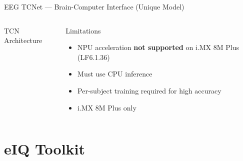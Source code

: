 \documentclass[aspectratio=169]{beamer}
\begin{document}
\begin{frame}{EEG TCNet — Brain-Computer Interface (Unique Model)}
\begin{columns}[T]
\begin{block}{TCN Architecture}
      \end{block}
      \vspace{4pt}
      \begin{block}{Limitations}
        \begin{itemize}\scriptsize
          \item NPU acceleration \textbf{not supported} on i.MX 8M Plus (LF6.1.36)
          \item Must use CPU inference
          \item Per-subject training required for high accuracy
          \item i.MX 8M Plus only
        \end{itemize}
      \end{block}
  \end{columns}
\end{frame}

\section{eIQ Toolkit}
\end{document}
